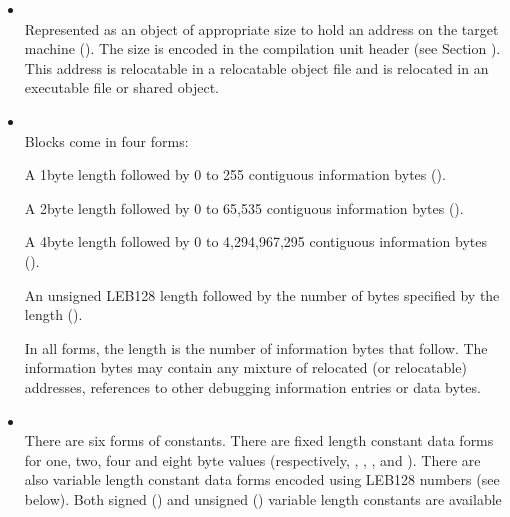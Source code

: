 \begin{itemize}
\item {} \\
Represented as an object of appropriate size to hold an
address on the target machine 
(). 
The size is
encoded in the compilation unit header 
(see Section ).
This address is relocatable in a relocatable object file and
is relocated in an executable file or shared object.

\item {} \\
Blocks come in four forms:

\begin{myindentpara}{1cm}
A 1\dash byte length followed by 0 to 255 contiguous information
bytes ().
\end{myindentpara}

\begin{myindentpara}{1cm}
A 2\dash byte length followed by 0 to 65,535 contiguous information
bytes ().
\end{myindentpara}

\begin{myindentpara}{1cm}
A 4\dash byte length followed by 0 to 4,294,967,295 contiguous
information bytes ().
\end{myindentpara}

\begin{myindentpara}{1cm}
An unsigned LEB128 length followed by the number of bytes
specified by the length ().
\end{myindentpara}

In all forms, the length is the number of information bytes
that follow. The information bytes may contain any mixture
of relocated (or relocatable) addresses, references to other
debugging information entries or data bytes.

\item {} \\
There are six forms of constants. There are fixed length
constant data forms for one, two, four and eight byte values
(respectively, 
, 
, 
,
and ). 
There are also variable length constant
data forms encoded using LEB128 numbers (see below). Both
signed () and unsigned 
() variable
length constants are available


\end{itemize}

